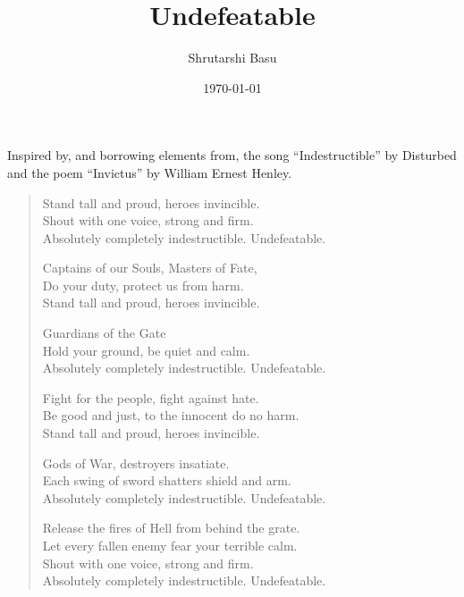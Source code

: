 \documentclass[11pt,letterpaper]{article}
\title{Undefeatable}
\author{Shrutarshi Basu}
\date{\today}
\begin{document}
\maketitle

\begin{center}
\begin{boxedminipage}{0.55\textwidth}
Inspired by, and borrowing elements from, the song ``Indestructible'' by Disturbed and the poem ``Invictus'' by William Ernest Henley.
\end{boxedminipage}
\end{center}

\begin{verse}
Stand tall and proud, heroes invincible.\\
Shout with one voice, strong and firm.\\
Absolutely completely indestructible. Undefeatable.

Captains of our Souls, Masters of Fate,\\
Do your duty, protect us from harm.\\
Stand tall and proud, heroes invincible.

Guardians of the Gate\\
Hold your ground, be quiet and calm.\\
Absolutely completely indestructible. Undefeatable.

Fight for the people, fight against hate.\\
Be good and just, to the innocent do no harm.\\
Stand tall and proud, heroes invincible.

Gods of War, destroyers insatiate.\\
Each swing of sword shatters shield and arm.\\
Absolutely completely indestructible. Undefeatable.

Release the fires of Hell from behind the grate.\\
Let every fallen enemy fear your terrible calm.\\
Shout with one voice, strong and firm.\\
Absolutely completely indestructible. Undefeatable.

\end{verse}

\begin{center}

\end{center}
\end{document}

